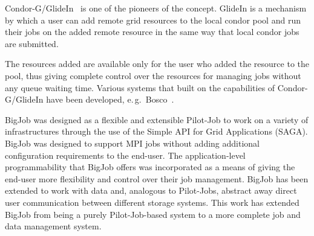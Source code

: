 \documentclass{sig-alternate}
\begin{document}
Condor-G/GlideIn~\cite{condor-g} is one of the pioneers of the \pilotjob
concept. GlideIn is a mechanism by which a user can add remote grid resources
to the local condor pool and run their jobs on the added remote resource in the
same way that local condor jobs are submitted.

The resources added are available only for the user who added the resource to
the pool, thus giving complete control over the resources for managing jobs
without any queue waiting time.
Various systems that built on the \pilot capabilities of Condor-G/GlideIn have
been developed, e.\,g.\ Bosco~\cite{bosco}.




BigJob was designed as a flexible and extensible Pilot-Job to work on a variety
of infrastructures through the use of the Simple API for Grid Applications
(SAGA). BigJob was designed to support MPI jobs without adding additional
configuration requirements to the end-user. The application-level
programmability that BigJob offers was incorporated as a means of giving the
end-user more flexibility and control over their job management. BigJob has
been extended to work with data and, analogous to Pilot-Jobs, abstract away
direct user communication between different storage systems. This work has
extended BigJob from being a purely Pilot-Job-based system to a more complete
job and data management system.
\end{document}

